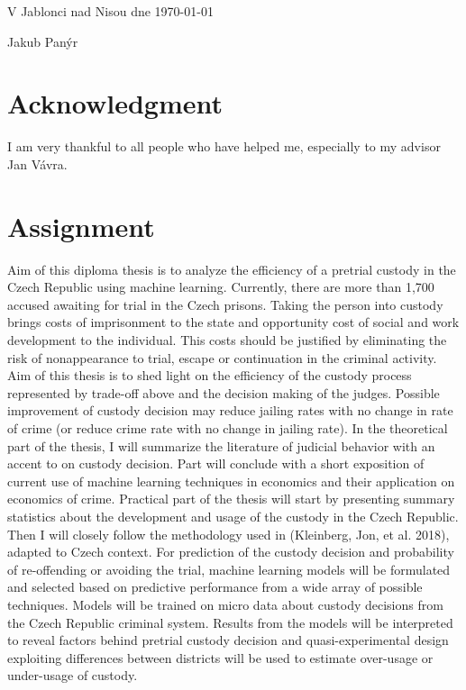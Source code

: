 \documentclass[12pt, twoside,openany]{book} %
\begin{document}
\vspace*{\fill}
\noindent
V Jablonci nad Nisou dne \today \hfill \dotfill

\begin{minipage}{\textwidth}
\hfill Jakub Panýr \hspace*{2.5cm}
\end{minipage} \newpage

\section*{Acknowledgment}        %
\noindent I am very thankful to all people who have helped me, especially to my advisor Jan Vávra. \newpage

\section*{Assignment}           %
Aim of this diploma thesis is to analyze the efficiency of a pretrial custody in the Czech Republic using machine learning.\newline
Currently, there are more than 1,700 accused awaiting for trial in the Czech prisons. Taking the person into custody brings costs of imprisonment to the state and opportunity cost of social and work development to the individual. This costs should be justified by eliminating the risk of nonappearance to trial, escape or continuation in the criminal activity. Aim of this thesis is to shed light on the efficiency of the custody process represented by trade-off above and the decision making of the judges. Possible improvement of custody decision may reduce jailing rates with no change in rate of crime (or reduce crime rate with no change in jailing rate). \newline
In the theoretical part of the thesis, I will summarize the literature of judicial behavior with an accent to on custody decision. Part will conclude with a short exposition of current use of machine learning techniques in economics and their application on economics of crime. \newline
Practical part of the thesis will start by presenting summary statistics about the development and usage of the custody in the Czech Republic. Then I will closely follow the methodology used in (Kleinberg, Jon, et al. 2018), adapted to Czech context. For prediction of the custody decision and probability of re-offending or avoiding the trial, machine learning models will be formulated and selected based on predictive performance from a wide array of possible techniques. Models will be trained on micro data about custody decisions from the Czech Republic criminal system. Results from the models will be interpreted to reveal factors behind pretrial custody decision and quasi-experimental design exploiting differences between districts will be used to estimate over-usage or under-usage of custody. \newpage
\end{document}
